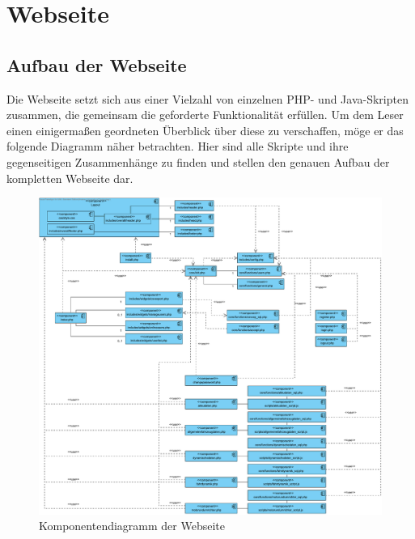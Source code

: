 \documentclass[fontsize = 12pt, paper = a4]{scrreprt}
\begin{document}
\newpage





\section{Webseite}


\subsection{Aufbau der Webseite}
Die Webseite setzt sich aus einer Vielzahl von einzelnen PHP- und Java-Skripten zusammen, die gemeinsam die geforderte Funktionalität erfüllen. Um dem Leser einen einigermaßen geordneten Überblick über diese zu verschaffen, möge er das folgende Diagramm näher betrachten. Hier sind alle Skripte und ihre gegenseitigen Zusammenhänge zu finden und stellen den genauen Aufbau der kompletten Webseite dar.

\begin{figure}[h]
\centering
\includegraphics[scale = 0.4]{webseite}
\caption[Komponentendiagramm der Webseite]{Komponentendiagramm der Webseite}
\label{aufbau}
\end{figure}
\end{document}
